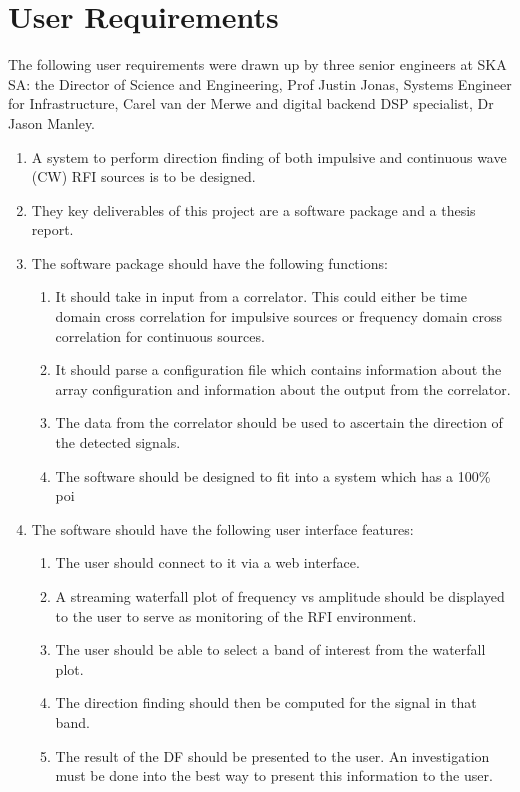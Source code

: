\section{User Requirements}

The following user requirements were drawn up by three senior engineers at SKA SA: the Director of Science and Engineering, Prof Justin Jonas, Systems Engineer for Infrastructure, Carel van der Merwe and digital backend DSP specialist, Dr Jason Manley. 

\begin{enumerate}
  \item A system to perform direction finding of both impulsive and continuous wave (CW) RFI sources is to be designed.
  \item They key deliverables of this project are a software package and a thesis report.
  \item The software package should have the following functions:
    \begin{enumerate}
      \item It should take in input from a correlator. This could either be time domain cross correlation for impulsive sources or frequency domain cross correlation for continuous sources. 
      \item It should parse a configuration file which contains information about the array configuration and information about the output from the correlator.
      \item The data from the correlator should be used to ascertain the direction of the detected signals.
      \item The software should be designed to fit into a system which has a 100\% \gls{poi}
    \end{enumerate}
  \item The software should have the following user interface features:
    \begin{enumerate}
      \item The user should connect to it via a web interface.
      \item A streaming waterfall plot of frequency vs amplitude should be displayed to the user to serve as monitoring of the RFI environment.
      \item The user should be able to select a band of interest from the waterfall plot.
      \item The direction finding should then be computed for the signal in that band.
      \item The result of the DF should be presented to the user. An investigation must be done into the best way to present this information to the user.

\end{enumerate}
\end{enumerate}
